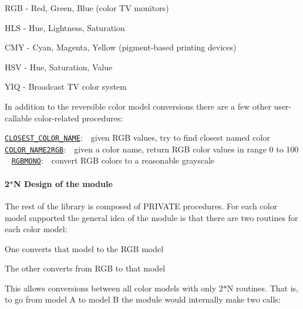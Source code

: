 \begin{DoxyDescription}
\begin{DoxyItemize}
\item R\+GB -\/ Red, Green, Blue (color TV monitors) 
\item H\+LS -\/ Hue, Lightness, Saturation 
\item C\+MY -\/ Cyan, Magenta, Yellow (pigment-\/based printing devices) 
\item H\+SV -\/ Hue, Saturation, Value 
\item Y\+IQ -\/ Broadcast TV color system 
\end{DoxyItemize}



In addition to the reversible color model conversions there are a few other user-\/callable color-\/related procedures\+: 



\href{closest_color_name.3m_color.html}{\tt C\+L\+O\+S\+E\+S\+T\+\_\+\+C\+O\+L\+O\+R\+\_\+\+N\+A\+ME}\+:~~given R\+GB values, try to find closest named color ~\newline
 \href{color_name2rgb.3m_color.html}{\tt C\+O\+L\+O\+R\+\_\+\+N\+A\+M\+E2\+R\+GB}\+:~~given a color name, return R\+GB color values in range 0 to 100 ~\newline
 \href{rgbmono.3m_color.html}{\tt R\+G\+B\+M\+O\+NO}\+:~~convert R\+GB colors to a reasonable grayscale

\paragraph*{2$\ast$N Design of the module}





The rest of the library is composed of P\+R\+I\+V\+A\+TE procedures. For each color model supported the general idea of the module is that there are two routines for each color model\+: 




\begin{DoxyItemize}
\item One converts that model to the R\+GB model  
\item The other converts from R\+GB to that model  
\end{DoxyItemize}



This allows conversions between all color models with only 2$\ast$N routines. That is, to go from model A to model B the module would internally make two calls\+: 





\end{DoxyDescription}

